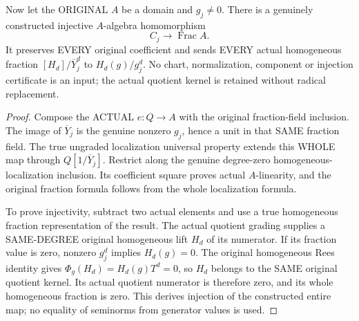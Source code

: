 \begin{theorem}
\label{algebra:actual-rees-chart-fraction-embedding}
\leanok
Now let the ORIGINAL $A$ be a domain and $g_j\ne0$. There is a genuinely
constructed injective $A$-algebra homomorphism
\[
 C_j\longrightarrow\operatorname{Frac}A.
\]
It preserves EVERY original coefficient and sends EVERY actual homogeneous
fraction $[H_d]/\overline Y_j^d$ to
$H_d(g)/g_j^d$. No chart, normalization, component or injection certificate
is an input; the actual quotient kernel is retained without radical replacement.
\end{theorem}
\begin{proof}
Compose the ACTUAL $e:Q\to A$ with the original fraction-field inclusion.
The image of $\overline Y_j$ is the genuine nonzero $g_j$, hence a unit in
that SAME fraction field. The true ungraded localization universal property
extends this WHOLE map through $Q[1/\overline Y_j]$. Restrict along the genuine
degree-zero homogeneous-localization inclusion. Its coefficient square proves
actual $A$-linearity, and the original fraction formula follows from the
whole localization formula.

To prove injectivity, subtract two actual elements and use a true homogeneous
fraction representation of the result. The actual quotient grading supplies a
SAME-DEGREE original homogeneous lift $H_d$ of its numerator. If its fraction
value is zero, nonzero $g_j^d$ implies $H_d(g)=0$. The original homogeneous
Rees identity gives $\Phi_g(H_d)=H_d(g)T^d=0$, so $H_d$ belongs to the SAME
original quotient kernel. Its actual quotient numerator is therefore zero,
and its whole homogeneous fraction is zero. This derives injection of the
constructed entire map; no equality of seminorms from generator values is used.
\end{proof}

